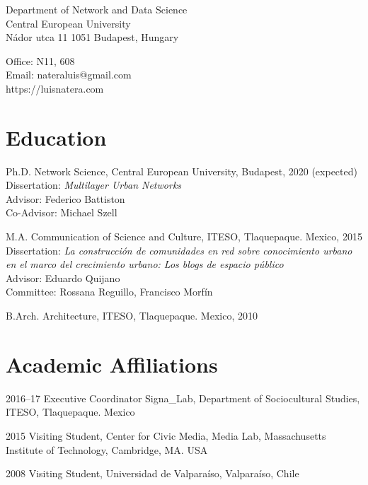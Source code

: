 \documentclass{academiccv}
\begin{document}
\raggedright

\namefont{\myname}

\vspace{1em}
\begin{minipage}[t]{0.495\textwidth}
  Department of Network and Data Science \\
  Central European University \\
  Nádor utca 11
  1051 Budapest, Hungary
\end{minipage}
\begin{minipage}[t]{0.495\textwidth}
  Office: N11, 608 \\
  Email: nateraluis@gmail.com \\
  https://luisnatera.com \\
\end{minipage}
\vspace{0.5em}



\section*{Education}
\begin{tablist}
	\item[Ph.D. ] \tab Network Science, Central European University, Budapest, 2020 (expected) \\
                  Dissertation: \textit{Multilayer Urban Networks} \\
                  Advisor: Federico Battiston \\
                  Co-Advisor: Michael Szell
	\item[M.A.]  \tab Communication of Science and Culture, ITESO, Tlaquepaque. Mexico, 2015 \\
					Dissertation: \textit{La construcción de comunidades en red sobre conocimiento urbano en el marco del crecimiento urbano: Los blogs de espacio público}\\
					Advisor: Eduardo Quijano \\
					Committee: Rossana Reguillo, Francisco Morfín
	\item[B.Arch.]  \tab Architecture,  ITESO, Tlaquepaque. Mexico, 2010
\end{tablist}


\section*{Academic Affiliations}
\begin{tablist}
	\item[2016--17] \tab Executive Coordinator Signa\_Lab, Department of Sociocultural Studies, ITESO, Tlaquepaque. Mexico
	\item[2015] \tab Visiting Student, Center for Civic Media,  Media Lab, Massachusetts Institute of Technology, Cambridge, MA. USA
	\item[2008] \tab Visiting Student, Universidad de Valparaíso, Valparaíso, Chile  
\end{tablist}
\end{document}
